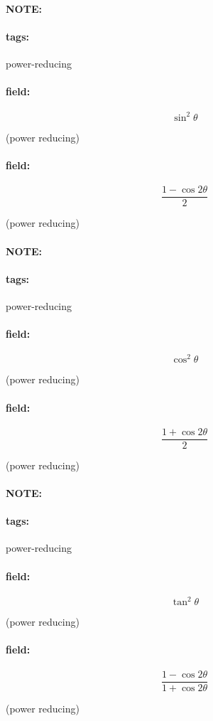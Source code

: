 \documentclass[12pt]{article}
\newenvironment{note}{\paragraph{NOTE:}}{}
\newenvironment{field}{\paragraph{field:}}{}
\newcommand*{\tags}[1]{\paragraph{tags: }#1}
\begin{document}
\begin{note}
    \tags{power-reducing}
    \begin{field}
    \[  
        \sin^2 \theta
    \] 
    \begin{center}
    (power reducing)
    \end{center}
    \end{field}
    \begin{field}
    \[
        \frac{1 - \cos 2\theta}{2}
    \] 
    \begin{center}
    (power reducing)
    \end{center}
    \end{field}
\end{note}

\begin{note}
    \tags{power-reducing}
    \begin{field}
    \[  
        \cos^2 \theta
    \] 
    \begin{center}
    (power reducing)
    \end{center}
    \end{field}
    \begin{field}
    \[
        \frac{1 + \cos 2\theta}{2}
    \] 
    \begin{center}
    (power reducing)
    \end{center}
    \end{field}
\end{note}

\begin{note}
    \tags{power-reducing}
    \begin{field}
    \[
        \tan^2 \theta  
    \] 
    \begin{center}
    (power reducing)
    \end{center}
    \end{field}
    \begin{field}
    \[
        \frac{1 - \cos 2\theta}{1 + \cos 2\theta}
    \] 
    \begin{center}
    (power reducing)
    \end{center}
    \end{field}
\end{note}
\end{document}
